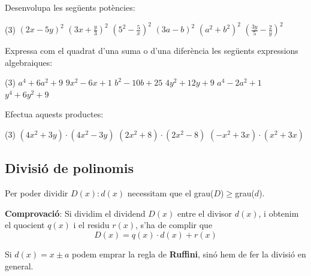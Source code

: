 \begin{mylist}
   
    	\exer  Desenvolupa les següents potències:
	    \begin{tasks}(3)
	      \task $\left(2{x} - 5{y}\right)^{2}$   
	      \task $\left(3{x} + \frac{y}{3}\right)^{2}$   
	      \task $\left(5^{2} - \frac{5}{x} \right)^{2}$
	       \task $\left(3{a} - {b}\right)^{2}$ 
	        \task $\left({a}^2 + {b}^{2}\right)^{2}$  
	         \task $\left(\frac{3y}{5} - \frac{2}{y}\right)^{2}$
	   \end{tasks}
   \answers[cols=1]{[$4x^2-20xy+25y^2$, $9x^2 +2xy+y^2/9$, $625-250+25/x^2$, $9a^2-6ab+b^2$, $a^4+2a^2b^2+b^4$, $9y^2/25 - 12/5+4/y^2$]}
   
    	\exer  Expressa com el quadrat d'una suma o d'una diferència les següents expressions algebraiques:
	    \begin{tasks}(3)
		   \task  $a^4 + 6a^2 + 9 $
		    \task  $9{x}^{2} - 6{x} + 1 $
		     \task  ${b}^{2} - 10{b} + 25$
		   \task  $4{y}^{2} + 12{y} + 9  $
		    \task  $a^4-2a^2+1$
		     \task  $y^{4} + 6{y}^{2} + 9$
	    \end{tasks}
    \answers[cols=1]{[$(a^2+3)^2$, $(3x-1)^2$, $(b-5)^2$, $(2y+3)^2$, $(a^2-1)^2$, $(y^2+3)^2$]}
   
   
   	\exer  Efectua aquests productes:
    \begin{tasks}(3)
     \task $(4x^{2} +3y)\cdot (4x^{2} -3y)$ \task $(2x^{2} +8)\cdot (2x^{2} -8)$  \task $(-x^{2} +3x)\cdot (x^{2} +3x)$
       \end{tasks}
   	\answers{[$16x^4-9y^2$, $4x^4-64$, $-x^4+9x^2$]}
\end{mylist}

 

\subsection{Divisió de polinomis}
\begin{theorybox}
	\begin{minipage}{0.7\textwidth}
		Per poder dividir $D(x):d(x)$ necessitam que el grau($D$)$\ge$grau($d$).
		
		\textbf{Comprovació}: Si dividim el dividend $D(x)$ entre el divisor $d(x)$, i obtenim el quocient $q(x)$ i el residu $r(x)$, s'ha de complir que 
		\begin{equation*}
		D(x) = q(x) \cdot d(x) + r(x)
		\end{equation*}
		
		Si $d(x)=x \pm a$ podem emprar la regla de \textbf{Ruffini}, sinó hem de fer la divisió en general.
	\end{minipage}
\hspace{0.5cm}
	\begin{minipage}{0.3\textwidth}
		\centering
		
	\end{minipage}
\end{theorybox}

